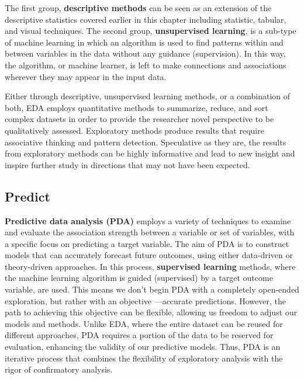 \documentclass[
  letterpaper,
  krantz1]{latex/krantz-mod}
\theoremstyle{definition}
\theoremstyle{definition}
\theoremstyle{remark}
\begin{document}
The first group, \textbf{descriptive methods}
can be seen as an extension of the descriptive statistics covered
earlier in this chapter including statistic, tabular, and visual
techniques. The second group, \textbf{unsupervised
learning}, is a sub-type of machine
learning in which an algorithm is used to find patterns within and
between variables in the data without any guidance
(supervision). In this way, the algorithm, or
machine learner, is left to make connections and associations wherever
they may appear in the input data.

Either through descriptive, unsupervised learning methods, or a
combination of both, EDA employs quantitative methods to summarize,
reduce, and sort complex datasets in order to provide the researcher
novel perspective to be qualitatively assessed. Exploratory methods
produce results that require associative thinking and pattern detection.
Speculative as they are, the results from exploratory methods can be
highly informative and lead to new insight and inspire further study in
directions that may not have been expected.

\subsection{Predict}\label{sec-analysis-predict}

\textbf{Predictive data analysis
(PDA)} employs a variety of
techniques to examine and evaluate the association strength between a
variable or set of variables, with a specific focus on predicting a
target variable. The aim of PDA is to construct models that can
accurately forecast future outcomes, using either
data-driven or
theory-driven approaches. In this process,
\textbf{supervised learning} methods, where
the machine learning algorithm is guided (supervised) by a target
outcome variable, are used. This means we don't begin PDA with a
completely open-ended exploration, but rather with an objective
---accurate predictions. However, the path to achieving this objective
can be flexible, allowing us freedom to adjust our models and methods.
Unlike EDA, where the entire
dataset can be reused for different approaches, PDA requires a portion
of the data to be reserved for evaluation, enhancing the validity of our
predictive models. Thus, PDA is an iterative process that combines the
flexibility of exploratory analysis with the rigor of confirmatory
analysis.
\end{document}
